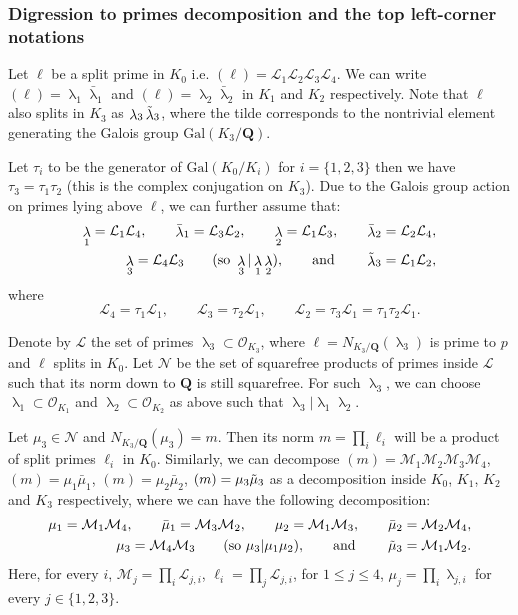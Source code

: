 \documentclass[10pt,letterpaper]{amsart}
\theoremstyle{plain}
\theoremstyle{definition}
\theoremstyle{definition}
\theoremstyle{plain}
\theoremstyle{plain}
\theoremstyle{plain}
\theoremstyle{remark}
\numberwithin{equation}{section}
\DeclareMathOperator{\la}{\lambda}
\def\cL{{\mathcal L}}
\def\cM{\mathcal M}
\def\cO{\mathcal O}
\newcommand{\Q}{\mathbf{Q}}
\begin{document}
\subsubsection{Digression to primes decomposition and 
 the top left-corner notations}\label{subsec:prime-decomp} Let $\ell$ be a split prime in $K_0$ i.e. $(\ell)=\cL_1\cL_2\cL_3\cL_4$. We can write $(\ell) = \la_1\bar{\la}_1$ and $(\ell) = \la_2\bar{\la}_2$ in $K_1$ and $K_2$ respectively. Note that $\ell$ also splits in $K_3$ as $\la_3\Tilde{\la}_3$, where the tilde corresponds to the nontrivial element generating the Galois group $\mathrm{Gal}(K_3/\Q)$.

 Let $\tau_i$ to be the generator of $\mathrm{Gal}(K_0/K_i)$ for $i=\{1,2,3\}$ then we have $\tau_3=\tau_1\tau_2$ (this is the complex conjugation on $K_3$). Due to the Galois group action on primes lying above $\ell$, we can further assume that:
\[\begin{split}
    \la_1=\cL_1\cL_4,\qquad \bar{\la}_1=\cL_3\cL_2,\qquad  \la_2=\cL_1\cL_3,\qquad \bar{\la}_2=\cL_2\cL_4, \\
     \la_3 = \cL_4\cL_3\qquad (\text{so } \la_3|\la_1\la_2),\qquad\text{and }\qquad \Tilde{\la}_3 = \cL_1\cL_2,
\end{split}\]
where
\begin{equation*}
    \cL_4=\tau_1\cL_1,\qquad \cL_3=\tau_2\cL_1, \qquad \cL_2=\tau_3\cL_1=\tau_1\tau_2\cL_1.
\end{equation*}

Denote by $\mathcal{L}$ the set of primes $\la_3\subset\cO_{K_3}$, where $\ell=N_{K_3/\Q}(\la_3)$ is prime to $p$ and $\ell$ splits in $K_0$. Let $\mathcal{N}$ be the set of squarefree products of primes inside $\mathcal{L}$ such that its norm down to $\Q$ is still squarefree. For such $\la_3$, we can choose $\la_1\subset\cO_{K_1}$ and $\la_2\subset\cO_{K_2}$ as above such that $\la_3|\la_1\la_2$.

Let $\mu_3\in \mathcal{N}$ and $N_{K_3/\Q}(\mu_3)=m$. Then its norm $m=\prod_i \ell_i$ will be a product of split primes $\ell_i$ in $K_0$. Similarly, we can decompose $(m)=\cM_1\cM_2\cM_3\cM_4$, $(m)=\mu_1\bar{\mu}_1$, $(m)=\mu_2\bar{\mu}_2$, $(m)=\mu_3\Tilde{\mu}_3$ as a decomposition inside $K_0$, $K_1$, $K_2$ and $K_3$ respectively, where we can have the following decomposition:
\[\begin{split}
    \mu_1=\cM_1\cM_4,\qquad \bar{\mu}_1=\cM_3\cM_2,\qquad  \mu_2=\cM_1\cM_3,\qquad \bar{\mu}_2=\cM_2\cM_4, \\
     \mu_3 = \cM_4\cM_3\qquad (\text{so } \mu_3|\mu_1\mu_2),\qquad\text{and }\qquad \Tilde{\mu}_3 = \cM_1\cM_2.
\end{split}\]
Here, for every $i$, $\cM_j=\prod_{i}\cL_{j,i}$, $\ell_i=\prod_j \cL_{j,i}$, for $1\le j\le 4$, $\mu_j=\prod_i \la_{j,i}$ for every $j\in\{1,2,3\}$.
\end{document}
